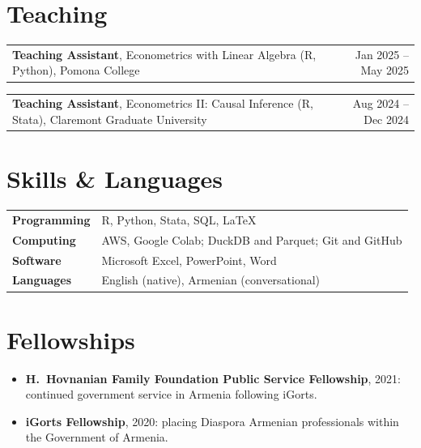 \documentclass[10pt,letterpaper]{article}
\makeatletter
\newcommand{\minentry}[2]{%
  \vspace{3pt}%
  \noindent\begin{tabularx}{\linewidth}{@{}X r@{}}
    #1 & #2 \\
  \end{tabularx}%
}
\makeatother
\begin{document}
\section{Teaching}

\minentry{\textbf{Teaching Assistant}, Econometrics with Linear Algebra (R, Python), Pomona College}{Jan 2025 -- May 2025}
\minentry{\textbf{Teaching Assistant}, Econometrics II: Causal Inference (R, Stata), Claremont Graduate University}{Aug 2024 -- Dec 2024}

\section{Skills \& Languages}
\noindent\begin{tabularx}{\linewidth}{@{}l X@{}}
  \textbf{Programming} & R, Python, Stata, SQL, \LaTeX \\[1pt]
  \textbf{Computing} & AWS, Google Colab; DuckDB and Parquet; Git and GitHub \\[1pt]
  \textbf{Software} & Microsoft Excel, PowerPoint, Word \\[1pt]
  \textbf{Languages} & English (native), Armenian (conversational) \\
\end{tabularx}

\section{Fellowships}
\begin{itemize}
  \item \textbf{H.\ Hovnanian Family Foundation Public Service Fellowship}, 2021: continued government service in Armenia following iGorts.
  \item \textbf{iGorts Fellowship}, 2020: placing Diaspora Armenian professionals within the Government of Armenia.
\end{itemize}
\end{document}
